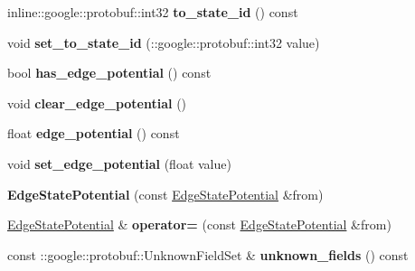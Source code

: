 \begin{DoxyCompactItemize}
\item 
\hypertarget{classgraph_1_1EdgeStatePotential_acdc19ad89d3da217371556b1d069a971}{
inline::google::protobuf::int32 {\bfseries to\_\-state\_\-id} () const }
\label{classgraph_1_1EdgeStatePotential_acdc19ad89d3da217371556b1d069a971}

\item 
\hypertarget{classgraph_1_1EdgeStatePotential_ad498cc27a96c02d74bc44718f289771c}{
void {\bfseries set\_\-to\_\-state\_\-id} (::google::protobuf::int32 value)}
\label{classgraph_1_1EdgeStatePotential_ad498cc27a96c02d74bc44718f289771c}

\item 
\hypertarget{classgraph_1_1EdgeStatePotential_a74db33f4d6408cb2f00a4c02d5b8d492}{
bool {\bfseries has\_\-edge\_\-potential} () const }
\label{classgraph_1_1EdgeStatePotential_a74db33f4d6408cb2f00a4c02d5b8d492}

\item 
\hypertarget{classgraph_1_1EdgeStatePotential_a8962a3e1a075a505dc2b212dd0308791}{
void {\bfseries clear\_\-edge\_\-potential} ()}
\label{classgraph_1_1EdgeStatePotential_a8962a3e1a075a505dc2b212dd0308791}

\item 
\hypertarget{classgraph_1_1EdgeStatePotential_a841fbeee1c881516d881fb0351f59662}{
float {\bfseries edge\_\-potential} () const }
\label{classgraph_1_1EdgeStatePotential_a841fbeee1c881516d881fb0351f59662}

\item 
\hypertarget{classgraph_1_1EdgeStatePotential_aafc6b6bf33dead5ba6f14120af0c3a1f}{
void {\bfseries set\_\-edge\_\-potential} (float value)}
\label{classgraph_1_1EdgeStatePotential_aafc6b6bf33dead5ba6f14120af0c3a1f}

\item 
\hypertarget{classgraph_1_1EdgeStatePotential_a07c6b74b96e49c9dd58dd6801d331734}{
{\bfseries EdgeStatePotential} (const \hyperlink{classgraph_1_1EdgeStatePotential}{EdgeStatePotential} \&from)}
\label{classgraph_1_1EdgeStatePotential_a07c6b74b96e49c9dd58dd6801d331734}

\item 
\hypertarget{classgraph_1_1EdgeStatePotential_aa84be9ac7930900ea711dd50c61a992c}{
\hyperlink{classgraph_1_1EdgeStatePotential}{EdgeStatePotential} \& {\bfseries operator=} (const \hyperlink{classgraph_1_1EdgeStatePotential}{EdgeStatePotential} \&from)}
\label{classgraph_1_1EdgeStatePotential_aa84be9ac7930900ea711dd50c61a992c}

\item 
\hypertarget{classgraph_1_1EdgeStatePotential_aa3d87d59c31b9583a2723bf7d838b7e8}{
const ::google::protobuf::UnknownFieldSet \& {\bfseries unknown\_\-fields} () const }
\label{classgraph_1_1EdgeStatePotential_aa3d87d59c31b9583a2723bf7d838b7e8}


\end{DoxyCompactItemize}
